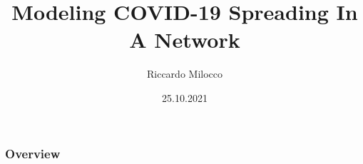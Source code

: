 \documentclass[xcolor={dvipsnames}]{beamer}
\title[Network Covid-19]{Modeling COVID-19 Spreading In A Network} %
\author{Riccardo Milocco} %
\institute[DFA - UniPD] %
{
{\normalsize Prof./Dr. Marco Baiesi} \\
\vspace{1cm}
{\normalsize Università Degli Studi di Padova} \\ %
\medskip
{\normalsize Dipartimento di Fisica e Astronomia G. Galilei} %
}
\date{25.10.2021} %
\begin{document}

\begin{frame}
\titlepage %
\end{frame}

\begin{frame}
\frametitle{Overview} %
\tableofcontents %
\end{frame}

\end{document}
